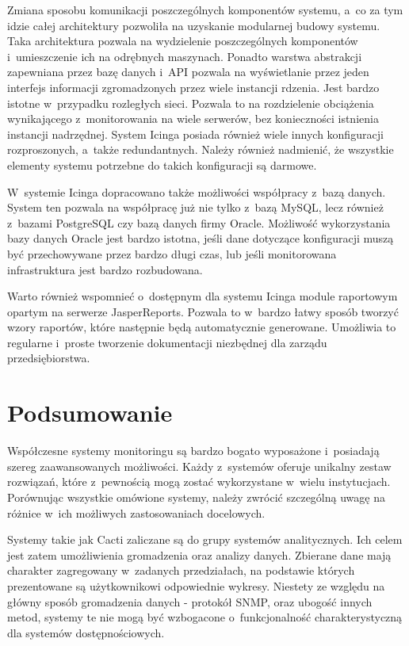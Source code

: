 Zmiana sposobu komunikacji poszczególnych komponentów systemu, a~co za
tym idzie całej architektury pozwoliła na uzyskanie modularnej budowy
systemu. Taka architektura pozwala na wydzielenie poszczególnych
komponentów i~umieszczenie ich na odrębnych maszynach. Ponadto warstwa
abstrakcji zapewniana przez bazę danych i~API pozwala na wyświetlanie
przez jeden interfejs informacji zgromadzonych przez wiele instancji
rdzenia. Jest bardzo istotne w~przypadku rozległych sieci. Pozwala to
na rozdzielenie obciążenia wynikającego z~monitorowania na wiele
serwerów, bez konieczności istnienia instancji nadrzędnej. System
Icinga posiada również wiele innych konfiguracji rozproszonych,
a~także redundantnych. Należy również nadmienić, że wszystkie elementy
systemu potrzebne do takich konfiguracji są darmowe.

W~systemie Icinga dopracowano także możliwości współpracy
z~bazą danych. System ten pozwala na współpracę już nie tylko z~bazą
MySQL, lecz również z~bazami PostgreSQL czy bazą danych firmy
Oracle. Możliwość wykorzystania bazy danych Oracle jest bardzo
istotna, jeśli dane dotyczące konfiguracji muszą być przechowywane
przez bardzo długi czas, lub jeśli monitorowana infrastruktura jest
bardzo rozbudowana.

Warto również wspomnieć o~dostępnym dla systemu Icinga module
raportowym opartym na serwerze
JasperReports\cite{www:JasperReports}. Pozwala to w~bardzo łatwy
sposób tworzyć wzory raportów, które następnie będą automatycznie
generowane. Umożliwia to regularne i~proste tworzenie dokumentacji
niezbędnej dla zarządu przedsiębiorstwa.

\section[Podsumowanie][Podsumowanie]{Podsumowanie}

Współczesne systemy monitoringu są bardzo bogato wyposażone
i~posiadają szereg zaawansowanych możliwości. Każdy z~systemów oferuje
unikalny zestaw rozwiązań, które z~pewnością mogą zostać wykorzystane
w~wielu instytucjach. Porównując wszystkie omówione systemy, należy
zwrócić szczególną uwagę na różnice w~ich możliwych zastosowaniach
docelowych.

Systemy takie jak Cacti zaliczane są do grupy systemów
analitycznych. Ich celem jest zatem umożliwienia gromadzenia oraz
analizy danych. Zbierane dane mają charakter zagregowany w~zadanych
przedziałach, na podstawie których prezentowane są użytkownikowi
odpowiednie wykresy. Niestety ze względu na główny sposób gromadzenia
danych - protokół SNMP, oraz ubogość innych metod, systemy te nie mogą
być wzbogacone o~funkcjonalność charakterystyczną dla systemów
dostępnościowych.

